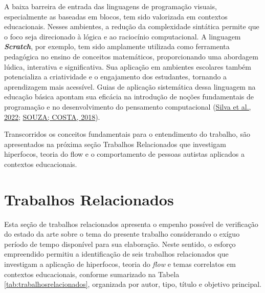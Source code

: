 \documentclass[
  12pt,
  a4paper,
]{article}
\begin{document}
A baixa barreira de entrada das linguagens de programação visuais,
especialmente as baseadas em blocos, tem sido valorizada em contextos
educacionais. Nesses ambientes, a redução da complexidade sintática
permite que o foco seja direcionado à lógica e ao raciocínio
computacional. A linguagem \textbf{\emph{Scratch}}, por exemplo, tem
sido amplamente utilizada como ferramenta pedagógica no ensino de
conceitos matemáticos, proporcionando uma abordagem lúdica, interativa e
significativa. Sua aplicação em ambientes escolares também potencializa
a criatividade e o engajamento dos estudantes, tornando a aprendizagem
mais acessível. Guias de aplicação sistemática dessa linguagem na
educação básica apontam sua eficácia na introdução de noções
fundamentais de programação e no desenvolvimento do pensamento
computacional (\protect\hyperlink{ref-silva2022}{Silva et al., 2022};
\protect\hyperlink{ref-souza2018}{SOUZA; COSTA, 2018}).

Transcorridos os conceitos fundamentais para o entendimento do trabalho,
são apresentados na próxima seção Trabalhos Relacionados que investigam
hiperfocos, teoria do flow e o comportamento de pessoas autistas
aplicados a contextos educacionais.

\hypertarget{trabalhos-relacionados}{%
\section{Trabalhos Relacionados}\label{trabalhos-relacionados}}

Esta seção de trabalhos relacionados apresenta o empenho possível de
verificação do estado da arte sobre o tema do presente trabalho
considerando o exíguo período de tempo disponível para sua elaboração.
Neste sentido, o esforço empreendido permitiu a identificação de seis
trabalhos relacionados que investigam a aplicação de hiperfocos, teoria
do \emph{flow} e temas correlatos em contextos educacionais, conforme
sumarizado na Tabela \ref{tab:trabalhosrelacionados}, organizada por
autor, tipo, título e objetivo principal.

\tiny
\captionsetup{font=normalsize}
\renewcommand{\arraystretch}{1.5}
\end{document}
